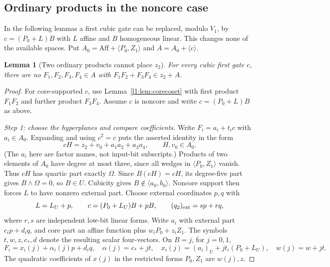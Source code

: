 \documentclass[11pt,a4paper]{article}
\theoremstyle{plain}
\newtheorem{lemma}[theorem]{Lemma}
\theoremstyle{remark}
\newcommand{\Aff}{\mathrm{Aff}}
\begin{document}
\subsection{Ordinary products in the noncore case}
In the following lemmas a first cubic gate can be replaced, modulo $V_1$, by $c=(P_0+L)B$ with $L$ affine and $B$ homogeneous linear. This changes none of the available spaces. Put $A_0=\Aff+\langle P_0,Z_1\rangle$ and $A=A_0+\langle c\rangle$.

\begin{lemma}[Two ordinary products cannot place $z_2$]\label{l1:lem:ordinarypair}
For every cubic first gate $c$, there are no $F_1,F_2,F_3,F_4\in A$ with $F_1F_2+F_3F_4\in z_2+A$.
\end{lemma}
\begin{proof}
For core-supported $c$, use Lemma~\ref{l1:lem:corecoset} with first product $F_1F_2$ and further product $F_3F_4$. Assume $c$ is noncore and write $c=(P_0+L)B$ as above.

\emph{Step 1: choose the hyperplanes and compare coefficients.}
Write $F_i=a_i+t_ic$ with $a_i\in A_0$. Expanding and using $c^2=c$ puts the asserted identity in the form
\[
cH=z_2+v_0+a_1a_2+a_3a_4,\qquad H,v_0\in A_0.
\]
(The $a_i$ here are factor names, not input-bit subscripts.) Products of two elements of $A_0$ have degree at most three, since all wedges in $\langle P_0,Z_1\rangle$ vanish. Thus $cH$ has quartic part exactly $\Omega$. Since $B(cH)=cH$, its degree-five part gives $B\wedge\Omega=0$, so $B\in U$. Cubicity gives $B\notin\langle a_0,b_0\rangle$. Noncore support then forces $L$ to have nonzero external part. Choose external coordinates $p,q$ with
\[
L=L_U+p,\qquad c=(P_0+L_U)B+pB,
\qquad (q_2)_{\rm ext}=sp+rq,
\]
where $r,s$ are independent low-bit linear forms. Write $a_i$ with external part $c_i p+d_iq$, and core part an affine function plus $w_iP_0+z_iZ_1$. The symbols $t,w,z,c_*,d$ denote the resulting scalar four-vectors. On $B=j$, for $j=0,1$,
\[
F_i=x_i(j)+\alpha_i(j)p+d_iq,\quad
\alpha(j)=c_*+jt,\quad
x_i(j)=(a_i)_U+jt_i(P_0+L_U),\quad w(j)=w+jt.
\]
The quadratic coefficients of $x(j)$ in the restricted forms $P_0,Z_1$ are $w(j),z$.


\end{proof}
\end{document}

